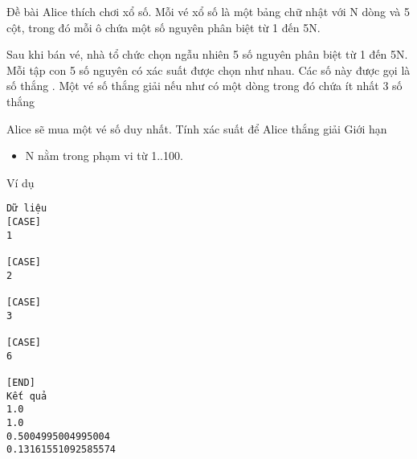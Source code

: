 Đề bài
Alice thích chơi xổ số. Mỗi vé xổ số là một bảng chữ nhật với N dòng và 5 cột, trong đó mỗi ô chứa một số nguyên phân biệt từ 1 đến 5N.  

   Sau khi bán vé, nhà tổ chức chọn ngẫu nhiên 5 số nguyên phân biệt từ 1 đến 5N. Mỗi tập con 5 số nguyên có xác suất được chọn như nhau. Các số này được gọi là   số thắng   . Một vé số thắng giải nếu như có một dòng trong đó chứa ít nhất 3   số thắng

   Alice sẽ mua một vé số duy nhất. Tính xác suất để Alice thắng giải
Giới hạn
\begin{itemize}
	\item     N nằm trong phạm vi từ 1..100.   
\end{itemize}
Ví dụ
\begin{verbatim}
Dữ liệu
[CASE]
1

[CASE]
2

[CASE]
3

[CASE]
6

[END]
Kết quả
1.0
1.0
0.5004995004995004
0.13161551092585574
\end{verbatim}